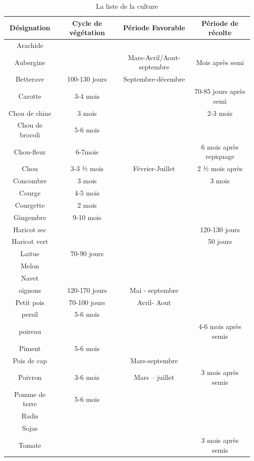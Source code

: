 \begin{table}[!h]
\caption{La liste de la culture}
\label{La liste de la culture}
\begin{center}
\begin{tabular}{|c|c|c|c|}
\hline 
Désignation & Cycle de végétation & Période Favorable & Période de récolte \\ 
\hline 
Arachide &  &  &  \\ 
\hline 
Aubergine & & Mars-Avril/Aout-septembre  &Mois après semi  \\ 
\hline
Betterave & 100-130 jours & Septembre-décembre &  \\ 
\hline 
Carotte &3-4 mois &  & 70-85 jours après semi \\ 
\hline 
Chou de chine & 3 mois &  & 2-3 mois \\ 
\hline
Chou de brocoli & 5-6 mois &  &  \\ 
\hline
Chou-fleur & 6-7mois &  & 6 mois après repiquage \\ 
\hline 
Chou &3-3 ½  mois & Février-Juillet &  2 ½  mois après\\ 
\hline
Concombre & 3 mois &  & 3 mois \\ 
\hline 
Courge & 4-5 mois &  &  \\ 
\hline
Courgette & 2 mois &  &  \\ 
\hline
Gingembre & 9-10 mois &  &  \\ 
\hline 
Haricot sec & &  & 120-130 jours \\ 
\hline 
Haricot vert & &  & 50 jours  \\ 
\hline
Laitue & 70-90 jours &  &  \\ 
\hline
Melon & &  &  \\ 
\hline 
Navet & &  &  \\ 
\hline
oignons & 120-170 jours &Mai - septembre  &  \\ 
\hline 
Petit pois &70-100 jours & Avril- Aout  &  \\ 
\hline 
persil & 5-6 mois &  &  \\ 
\hline
poireau & &  &4-6 mois après semis  \\ 
\hline
Piment  & 5-6 mois &  &  \\ 
\hline
Pois de cap & & Mars-septembre &  \\ 
\hline 
Poivron & 3-6 mois & Mars – juillet & 3 mois après semis  \\ 
\hline
Pomme de terre & 5-6 mois &  &  \\ 
\hline 
Radis &  &  &  \\ 
\hline 
Sojas & &  &  \\ 
\hline
Tomate & &  &  3 mois après semis\\ 
\hline
\end{tabular}
\end{center} 
\end{table} 
